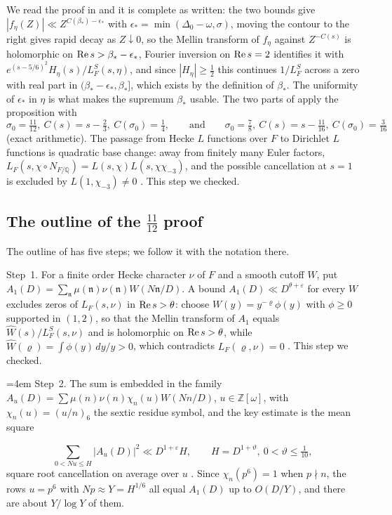 We read the proof in \cite{OAI26a} and it is complete as written: the two bounds give $|f_\eta(Z)|\ll Z^{C(\beta_*)-\epsilon_*}$ with $\epsilon_*=\min(\Delta_0-\omega,\sigma)$, moving the contour to the right gives rapid decay as $Z\downarrow0$, so the Mellin transform of $f_\eta$ against $Z^{-C(s)}$ is holomorphic on $\operatorname{Re} s>\beta_*-\epsilon_*$, Fourier inversion on $\operatorname{Re} s=2$ identifies it with $e^{(s-5/6)^2}H_\eta(s)/L_F^S(s,\eta)$, and since $|H_\eta|\ge\frac12$ this continues $1/L_F^S$ across a zero with real part in $(\beta_*-\epsilon_*,\beta_*]$, which exists by the definition of $\beta_*$. The uniformity of $\epsilon_*$ in $\eta$ is what makes the supremum $\beta_*$ usable. The two parts of \cite{OAI26a} apply the proposition with
\[
\sigma_0=\tfrac{11}{12},\ C(s)=s-\tfrac23,\ C(\sigma_0)=\tfrac14,\qquad\text{and}\qquad\sigma_0=\tfrac78,\ C(s)=s-\tfrac{11}{16},\ C(\sigma_0)=\tfrac3{16}
\]
(exact arithmetic). The passage from Hecke $L$ functions over $F$ to Dirichlet $L$ functions is quadratic base change: away from finitely many Euler factors, $L_F(s,\chi\circ N_{F/\mathbb Q})=L(s,\chi)L(s,\chi\chi_{-3})$, and the possible cancellation at $s=1$ is excluded by $L(1,\chi_{-3})\ne0$ \cite[Section~3]{OAI26b}. This step we checked.

\subsection{The outline of the $\frac{11}{12}$ proof}

The outline of \cite[Section~2]{OAI26b} has five steps; we follow it with the notation there.

Step~1. For a finite order Hecke character $\nu$ of $F$ and a smooth cutoff $W$, put $A_1(D)=\sum_{\mathfrak n}\mu(\mathfrak n)\nu(\mathfrak n)W(N\mathfrak n/D)$. A bound $A_1(D)\ll D^{\theta+\varepsilon}$ for every $W$ excludes zeros of $L_F(s,\nu)$ in $\operatorname{Re} s>\theta$: choose $W(y)=y^{-\varrho}\phi(y)$ with $\phi\ge0$ supported in $(1,2)$, so that the Mellin transform of $A_1$ equals $\widehat W(s)/L_F^S(s,\nu)$ and is holomorphic on $\operatorname{Re} s>\theta$, while $\widehat W(\varrho)=\int\phi(y)\,dy/y>0$, which contradicts $L_F(\varrho,\nu)=0$ \cite[Section~3]{OAI26b}. This step we checked.

{\emergencystretch=4em Step~2. The sum is embedded in the family $A_u(D)=\sum\mu(n)\nu(n)\allowbreak\chi_n(u)W(N n/D)$, $u\in\mathbb Z[\omega]$, with $\chi_n(u)=(u/n)_6$ the sextic residue symbol, and the key estimate is the mean square\par}
\begin{equation}\label{qrh:eq:ms}
\sum_{0<N u\le H}|A_u(D)|^2\ll D^{1+\varepsilon}H,\qquad H=D^{1+\vartheta},\ 0<\vartheta\le\tfrac1{10},
\end{equation}
square root cancellation on average over $u$ \cite[(2.3) and Proposition~3.1]{OAI26b}. Since $\chi_n(p^6)=1$ when $p\nmid n$, the rows $u=p^6$ with $N p\approx Y=H^{1/6}$ all equal $A_1(D)$ up to $O(D/Y)$, and there are about $Y/\log Y$ of them.

